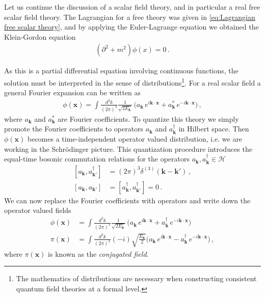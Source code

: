 Let us continue the discussion of a scalar field theory, and in particular a real free scalar field theory. The Lagrangian for a free theory was given in \cref{eq:Lagrangian free scalar theory}, and by applying the Euler-Lagrange equation we obtained the Klein-Gordon equation
\begin{align}
    (\partial^{2}+m^{2})\phi(x)=0\,.
\end{align}

As this is a partial differential equation involving continuous functions, the solution must be interpreted in the sense of distributions\footnote{The mathematics of distributions are necessary when constructing consistent quantum field theories at a formal level.}. For a real scalar field a general Fourier expansion can be written as
\begin{align}
    \phi(\mathbf{x})=\int \frac{d^{3}k}{(2\pi)^{3}}\frac{1}{\sqrt{2E_{\mathbf{k}}}}\,\big(a_{\mathbf{k}}\,e^{i\mathbf{k}\cdot\mathbf{x}}+a^{*}_{\mathbf{k}}\,e^{-i\mathbf{k}\cdot\mathbf{x}}\big)\,,
\end{align}
where $a_{\mathbf{k}}$ and $a_{\mathbf{k}}^{*}$ are Fourier coefficients. To quantize this theory we simply promote the Fourier coefficients to operators $a_{\mathbf{k}}$ and $a_{\mathbf{k}}^{\dagger}$ in Hilbert space. Then $\phi(\mathbf{x})$ becomes a time-independent operator valued distribution, i.e. we are working in the Schrödinger picture. This quantization procedure introduces the equal-time bosonic commutation relations for the operators $a_{\mathbf{k}},a^{\dagger}_{\mathbf{k}}\in\mathcal{H}$
\begin{align}\label{eq:commutaros a and adagger}
    [a_{\mathbf{k}},a_{\mathbf{k'}}^{\dagger}]&=(2\pi)^{3}\delta^{(3)}(\mathbf{k}-\mathbf{k}')\,,
    \\
    [a_{\mathbf{k}},a_{\mathbf{k'}}]&=[a_{\mathbf{k}}^{\dagger},a_{\mathbf{k'}}^{\dagger}]=0\,.
\end{align}
We can now replace the Fourier coefficients with operators and write down the operator valued fields
\begin{align}
    \phi(\mathbf{x})&=\int \frac{d^{3}k}{(2\pi)^{3}}\frac{1}{\sqrt{2E_{\mathbf{k}}}}\,\big(a_{\mathbf{k}}\,e^{i\mathbf{k}\cdot\mathbf{x}}+a^{\dagger}_{\mathbf{k}}\,e^{-i\mathbf{k}\cdot\mathbf{x}}\big)
    \\
    \pi(\mathbf{x})&=\int \frac{d^{3}k}{(2\pi)^{3}}(-i)\sqrt{\frac{E_{\mathbf{k}}}{2}}\big(a_{\mathbf{k}}\,e^{i\mathbf{k}\cdot\mathbf{x}}-a^{\dagger}_{\mathbf{k}}\,e^{-i\mathbf{k}\cdot\mathbf{x}}\big)\,,
\end{align}
where $\pi(\mathbf{x})$ is known as the \emph{conjugated field}.

